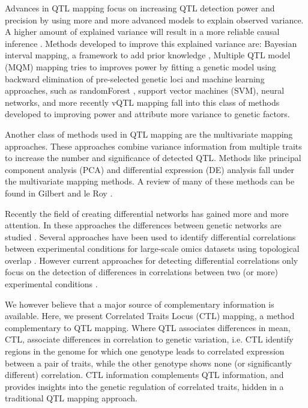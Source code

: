   Advances in QTL mapping focus on increasing QTL detection power and precision by using more and more advanced models to explain 
  observed variance. A higher amount of explained variance will result in a more reliable causal inference \cite{Li:2010}. Methods 
  developed to improve this explained variance are: Bayesian interval mapping, a framework to add prior knowledge \cite{Yandell:2007, 
  Hageman:2011}, Multiple QTL model (MQM) mapping tries to improves power by fitting a genetic model using backward elimination of 
  pre-selected genetic loci\cite{Jansen:1993, Arends:2010} and machine learning approaches, such as randomForest \cite{Bureau:2003}, 
  support vector machines (SVM), neural networks, and more recently vQTL mapping \cite{Valdar:2011} fall into this class of methods
  developed to improving power and attribute more variance to genetic factors.

  Another class of methods used in QTL mapping are the multivariate mapping approaches. These approaches combine variance information 
  from multiple traits to increase the number and significance of detected QTL. Methods like principal component analysis (PCA) and 
  differential expression (DE) analysis fall under the multivariate mapping methods. A review of many of these methods can be found 
  in Gilbert and le Roy \cite{Gilbert:2003}.

  Recently the field of creating differential networks has gained more and more attention. In these approaches the differences 
  between genetic networks are studied \cite{Fuente:2010,Horvath:2008}. Several approaches have been used to identify differential 
  correlations between experimental conditions for large-scale omics datasets using topological overlap \cite{Tesson:2010}. However 
  current approaches for detecting differential correlations only focus on the detection of differences in correlations between 
  two (or more) experimental conditions \cite{Fukushima:2013, Tesson:2010,Horvath:2008}. 

  We however believe that a major source of complementary information is available. Here, we present Correlated Traits Locus (CTL) 
  mapping, a method complementary to QTL mapping. Where QTL associates differences in mean, CTL, associate differences in correlation to 
  genetic variation, i.e. CTL identify regions in the genome for which one genotype leads to correlated expression between a pair of 
  traits, while the other genotype shows none (or significantly different) correlation. CTL information complements QTL information, 
  and provides insights into the genetic regulation of correlated traits, hidden in a traditional QTL mapping approach.
  
